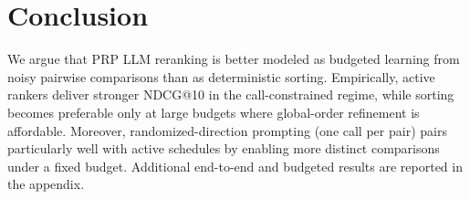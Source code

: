 \documentclass[11pt]{article}
\begin{document}

\section{Conclusion}
We argue that PRP LLM reranking is better modeled as budgeted learning from noisy pairwise comparisons than as deterministic sorting.
Empirically, active rankers deliver stronger NDCG@10 in the call-constrained regime, while sorting becomes preferable only at large budgets where global-order refinement is affordable.
Moreover, randomized-direction prompting (one call per pair) pairs particularly well with active schedules by enabling more distinct comparisons under a fixed budget.
Additional end-to-end and budgeted results are reported in the appendix.


\end{document}
